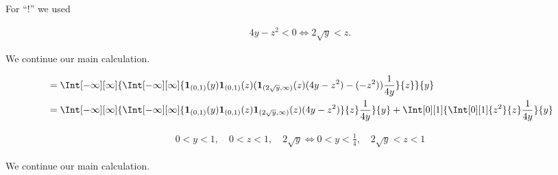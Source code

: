 \begin{solution}
\begin{enumerate}[label = (\alph*)]
    For \enquote{!} we used

    \begin{align*}
        4 y - z^2 < 0
        \iff
        2 \sqrt y < z.
    \end{align*}

    We continue our main calculation.

    \begin{align*}
        & =
        \Int[-\infty][\infty]
        {
            \Int[-\infty][\infty]
            {
                \mathbf 1_{(0, 1)}(y)
                \mathbf 1_{(0, 1)}(z)
                (
                    \mathbf 1_{(2 \sqrt y, \infty)}(z) (4 y - z^2)
                    -
                    (-z^2)
                )
                \frac{1}{4 y}
            }{z}
        }{y} \\
        & =
        \Int[-\infty][\infty]
        {
            \Int[-\infty][\infty]
            {
                \mathbf 1_{(0, 1)}(y)
                \mathbf 1_{(0, 1)}(z)
                \mathbf 1_{(2 \sqrt y, \infty)}(z) (4 y - z^2)
            }{z}
            \frac{1}{4 y}
        }{y}
        +
        \Int[0][1]
        {
            \Int[0][1]
            {
                z^2
            }{z}
            \frac{1}{4 y}
        }{y}
    \end{align*}

    \begin{align*}
        0 < y < 1, \quad 0 < z < 1, \quad 2 \sqrt y
        \iff
        0 < y < \frac{1}{4}, \quad 2 \sqrt y < z < 1
    \end{align*}

    We continue our main calculation.


\end{enumerate}
\end{solution}
